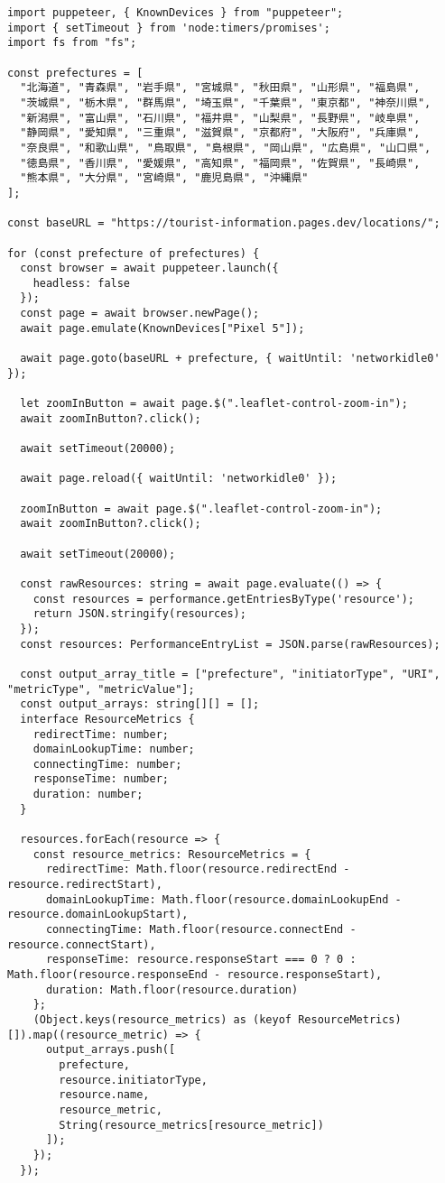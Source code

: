\begin{lstlisting}[caption={PuppeteerとResource Timing APIを用いたズーム時の画像の読み込み時間の測定},label={lst:PuppeteerとResource Timing APIを用いたズーム時の画像の読み込み時間の測定}]
import puppeteer, { KnownDevices } from "puppeteer";
import { setTimeout } from 'node:timers/promises';
import fs from "fs";

const prefectures = [
  "北海道", "青森県", "岩手県", "宮城県", "秋田県", "山形県", "福島県",
  "茨城県", "栃木県", "群馬県", "埼玉県", "千葉県", "東京都", "神奈川県",
  "新潟県", "富山県", "石川県", "福井県", "山梨県", "長野県", "岐阜県",
  "静岡県", "愛知県", "三重県", "滋賀県", "京都府", "大阪府", "兵庫県",
  "奈良県", "和歌山県", "鳥取県", "島根県", "岡山県", "広島県", "山口県",
  "徳島県", "香川県", "愛媛県", "高知県", "福岡県", "佐賀県", "長崎県",
  "熊本県", "大分県", "宮崎県", "鹿児島県", "沖縄県"
];

const baseURL = "https://tourist-information.pages.dev/locations/";

for (const prefecture of prefectures) {
  const browser = await puppeteer.launch({
    headless: false
  });
  const page = await browser.newPage();
  await page.emulate(KnownDevices["Pixel 5"]);

  await page.goto(baseURL + prefecture, { waitUntil: 'networkidle0' });

  let zoomInButton = await page.$(".leaflet-control-zoom-in");
  await zoomInButton?.click();

  await setTimeout(20000);

  await page.reload({ waitUntil: 'networkidle0' });

  zoomInButton = await page.$(".leaflet-control-zoom-in");
  await zoomInButton?.click();

  await setTimeout(20000);

  const rawResources: string = await page.evaluate(() => {
    const resources = performance.getEntriesByType('resource');
    return JSON.stringify(resources);
  });
  const resources: PerformanceEntryList = JSON.parse(rawResources);

  const output_array_title = ["prefecture", "initiatorType", "URI", "metricType", "metricValue"];
  const output_arrays: string[][] = [];
  interface ResourceMetrics {
    redirectTime: number;
    domainLookupTime: number;
    connectingTime: number;
    responseTime: number;
    duration: number;
  }

  resources.forEach(resource => {
    const resource_metrics: ResourceMetrics = {
      redirectTime: Math.floor(resource.redirectEnd - resource.redirectStart),
      domainLookupTime: Math.floor(resource.domainLookupEnd - resource.domainLookupStart),
      connectingTime: Math.floor(resource.connectEnd - resource.connectStart),
      responseTime: resource.responseStart === 0 ? 0 : Math.floor(resource.responseEnd - resource.responseStart),
      duration: Math.floor(resource.duration)
    };
    (Object.keys(resource_metrics) as (keyof ResourceMetrics)[]).map((resource_metric) => {
      output_arrays.push([
        prefecture,
        resource.initiatorType,
        resource.name,
        resource_metric,
        String(resource_metrics[resource_metric])
      ]);
    });
  });


\end{lstlisting}
